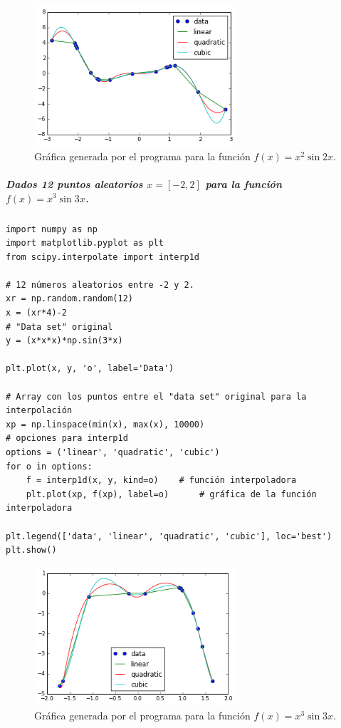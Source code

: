 \documentclass[12pt]{article}
\begin{document}
\begin{figure}[H]
\centering
\includegraphics[width=7.5cm]{5}
\caption{Gráfica generada por el programa para la función $f(x)= \displaystyle x^2\sin{2x}$.}
\end{figure}

\subparagraph*{Dados 12 puntos aleatorios $x=[-2,2]$ para la función $f(x)= \displaystyle x^3\sin{3x}$.}
\begin{verbatim}
import numpy as np
import matplotlib.pyplot as plt
from scipy.interpolate import interp1d

# 12 números aleatorios entre -2 y 2.
xr = np.random.random(12)
x = (xr*4)-2
# "Data set" original
y = (x*x*x)*np.sin(3*x)

plt.plot(x, y, 'o', label='Data')

# Array con los puntos entre el "data set" original para la interpolación
xp = np.linspace(min(x), max(x), 10000)
# opciones para interp1d
options = ('linear', 'quadratic', 'cubic')
for o in options:
    f = interp1d(x, y, kind=o)    # función interpoladora
    plt.plot(xp, f(xp), label=o)      # gráfica de la función interpoladora
    
plt.legend(['data', 'linear', 'quadratic', 'cubic'], loc='best')
plt.show()
\end{verbatim}

\begin{figure}[H]
\centering
\includegraphics[width=7.5cm]{6}
\caption{Gráfica generada por el programa para la función $f(x)= \displaystyle x^3\sin{3x}$.}
\end{figure}
\end{document}

